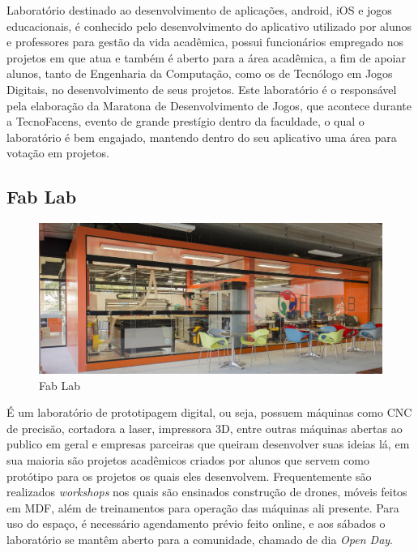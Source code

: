 \documentclass[
	12pt,				%
	oneside,			%
	a4paper,			%
	chapter=TITLE,		%
	section=TITLE,		%
	sumario=tradicional %
	english,			%
	french,				%
	spanish,			%
	brazil				%
	]{abntex2}
\begin{document}
Laboratório destinado ao desenvolvimento de aplicações, android, iOS e jogos educacionais, é conhecido pelo desenvolvimento do aplicativo utilizado por alunos e professores para gestão da vida acadêmica, possui funcionários empregado nos projetos em que atua e também é aberto para a área acadêmica, a fim de apoiar alunos, tanto de Engenharia da Computação, como os de Tecnólogo em Jogos Digitais, no desenvolvimento de seus projetos. Este laboratório é o responsável pela elaboração da Maratona de Desenvolvimento de Jogos, que acontece durante a TecnoFacens, evento de grande prestígio dentro da faculdade, o qual o laboratório é bem engajado, mantendo dentro do seu aplicativo uma área para votação em projetos.

\subsection{Fab Lab}

\begin{figure}[htb]
	\caption{\label{fig:fablab} Fab Lab}
	\begin{center}
		\includegraphics[scale=0.7]{fablab}
	\end{center}
\end{figure}

É um laboratório de prototipagem digital, ou seja, possuem máquinas como CNC de precisão, cortadora a laser, impressora 3D, entre outras máquinas abertas ao publico em geral e empresas parceiras que queiram desenvolver suas ideias lá, em sua maioria são projetos acadêmicos criados por alunos que servem como protótipo para os projetos os quais eles desenvolvem. Frequentemente são realizados \textit{workshops} nos quais são ensinados construção de drones, móveis feitos em MDF, além de treinamentos para operação das máquinas ali presente. Para uso do espaço, é necessário agendamento prévio feito online, e aos sábados o laboratório se mantêm aberto para a comunidade, chamado de dia \textit{Open Day}.
\end{document}
